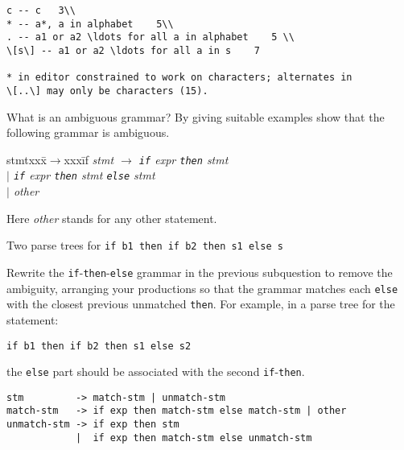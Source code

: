 \begin{questions}
\begin{subquestions}
\begin{modelanswer}
\begin{verbatim}
c -- c   3\\
* -- a*, a in alphabet    5\\
. -- a1 or a2 \ldots for all a in alphabet    5 \\
\[s\] -- a1 or a2 \ldots for all a in s    7

* in editor constrained to work on characters; alternates in
\[..\] may only be characters (15).
\end{verbatim}
\end{modelanswer}  

\vspace{0.1in}


\subquestion

What is an ambiguous grammar? By giving suitable examples show that the
        following grammar is ambiguous. 
\begin{tabbing}
stmtxxx\=$\rightarrow$xxx\=if\kill
\it
stmt \> $\rightarrow$ \> \verb"if" {\it expr\/} \verb"then" {\it stmt} \\
\it
     \> $\mid$ \> \verb"if" {\it expr\/} \verb"then" {\it stmt\/} \verb"else" {\it stmt} \\
     \> $\mid$ \> {\it other}
\end{tabbing}
Here {\it other\/} stands for any other statement.
\begin{modelanswer}
Two parse trees for \verb"if b1 then if b2 then s1 else s"
\end{modelanswer}

\subquestion Rewrite the \verb"if"-\verb"then"-\verb"else" grammar in the
previous subquestion to remove the ambiguity, arranging your productions
so that the grammar matches each \verb"else" with the closest previous
unmatched \verb"then".
For example, in a parse tree for the statement:
\begin{verbatim}
if b1 then if b2 then s1 else s2
\end{verbatim}
the \verb"else" part should be associated with the 
second \verb"if"-\verb"then". 
\begin{modelanswer}
\begin{verbatim}
stm         -> match-stm | unmatch-stm
match-stm   -> if exp then match-stm else match-stm | other
unmatch-stm -> if exp then stm
            |  if exp then match-stm else unmatch-stm
\end{verbatim}
\end{modelanswer}
\end{subquestions}



\end{questions}
